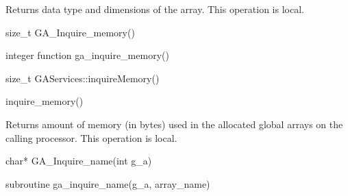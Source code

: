 \documentclass[12pt]{article}
\begin{document}
\begin{desc}

Returns data type and dimensions of the array.
This operation is local. 


\begin{capi}
\begin{ccode}
size_t GA_Inquire_memory()
\end{ccode}
\end{capi}

\begin{fapi}
\begin{fcode}
integer function ga_inquire_memory()
\end{fcode}
\end{fapi}

\begin{cxxapi}
\begin{cxxcode}
size_t GAServices::inquireMemory()
\end{cxxcode}
\end{cxxapi}

\begin{pyapi}
\begin{pycode}
inquire_memory() 
\end{pycode}
\end{pyapi} 


Returns amount of memory (in bytes) used in the allocated global arrays on 
the calling processor.
This operation is local.

\end{desc}


\begin{capi}
\begin{ccode}
char* GA_Inquire_name(int g_a)
\end{ccode}
\begin{funcargs}
\end{funcargs}
\end{capi}

\begin{fapi}
\begin{fcode}
subroutine ga_inquire_name(g_a, array_name)
\end{fcode}
\begin{funcargs}
\end{funcargs}
\end{fapi}
\end{document}
